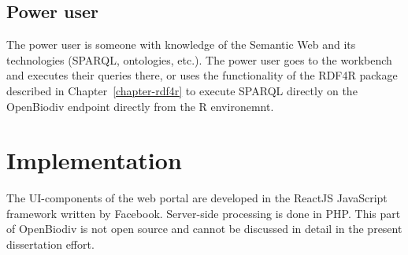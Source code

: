 \subsection{Power user}

The power user is someone with knowledge of the Semantic Web and its technologies (SPARQL, ontologies, etc.). The power user goes to the workbench and executes their queries there, or uses the functionality of the RDF4R package described in Chapter~\ref{chapter-rdf4r} to execute SPARQL directly on the OpenBiodiv endpoint directly from the R environemnt.

\section{Implementation}

The UI-components of the web portal are developed in the ReactJS JavaScript framework written by Facebook. Server-side processing is done in PHP. This part of OpenBiodiv is not open source and cannot be discussed in detail in the present dissertation effort.
